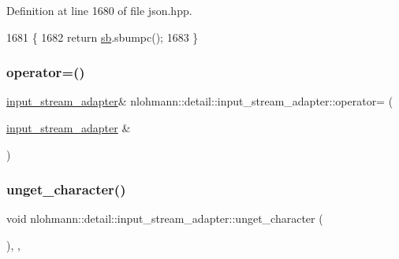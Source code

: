 Definition at line 1680 of file json.\+hpp.


\begin{DoxyCode}
1681     \{
1682         \textcolor{keywordflow}{return} \hyperlink{classnlohmann_1_1detail_1_1input__stream__adapter_addd96de4b5cbd9925ed5d8a0f0261143}{sb}.sbumpc();
1683     \}
\end{DoxyCode}
\mbox{\label{classnlohmann_1_1detail_1_1input__stream__adapter_aeac5048221929b8f7558d1698dd0fb3a}} 
\subsubsection{\texorpdfstring{operator=()}{operator=()}}
{\footnotesize\ttfamily \hyperlink{classnlohmann_1_1detail_1_1input__stream__adapter}{input\+\_\+stream\+\_\+adapter}\& nlohmann\+::detail\+::input\+\_\+stream\+\_\+adapter\+::operator= (\begin{DoxyParamCaption}\item[{\hyperlink{classnlohmann_1_1detail_1_1input__stream__adapter}{input\+\_\+stream\+\_\+adapter} \&}]{ }\end{DoxyParamCaption})\hspace{0.3cm}{\ttfamily [delete]}}

\mbox{\label{classnlohmann_1_1detail_1_1input__stream__adapter_ab6a65d3816ce4027ef4d2013a13ee697}} 
\subsubsection{\texorpdfstring{unget\+\_\+character()}{unget\_character()}}
{\footnotesize\ttfamily void nlohmann\+::detail\+::input\+\_\+stream\+\_\+adapter\+::unget\+\_\+character (\begin{DoxyParamCaption}{ }\end{DoxyParamCaption})\hspace{0.3cm}{\ttfamily [inline]}, {\ttfamily [override]}, {\ttfamily [virtual]}}



